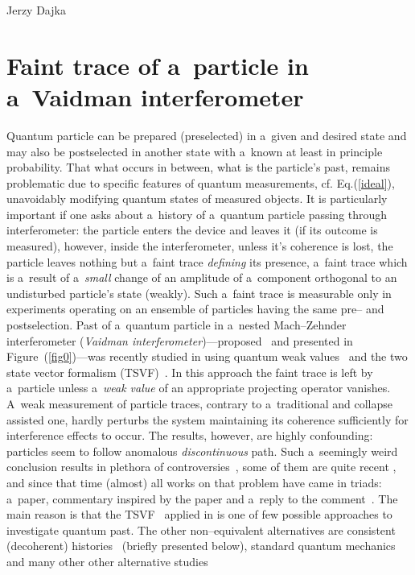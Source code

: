 \begin{artengenv}{Jerzy Dajka}
\section{Faint trace of a~particle in a~Vaidman interferometer}



Quantum particle can be prepared (preselected) in a~given and desired state and may also be postselected in another state with a~known at least in principle probability. That what occurs in between, what is the particle's past, remains problematic due to specific features of quantum measurements, cf. Eq.(\ref{ideal}), unavoidably modifying quantum states of measured objects. It is particularly important if one asks about a~history of a~quantum particle passing through interferometer: the particle enters the device and leaves it (if its outcome is measured), however, inside the interferometer, unless it's coherence is lost, the particle leaves nothing but a~faint trace {\it defining} its presence, a~faint trace which
is a~result of a~{\it small} change of an amplitude of a~component orthogonal to an undisturbed particle's state (weakly). Such a~faint trace is measurable  only in experiments operating on an
ensemble of particles having the same pre-- and postselection.
%
%
Past of a~quantum particle in a~nested Mach--Zehnder interferometer ({\it Vaidman interferometer})---proposed~\parencite{PhysRevA.87.052104} and presented in Figure~(\ref{fig0})---was recently studied in \parencite{PhysRevA.87.052104} using 
quantum weak values~\parencite{primus,weak,Aharonov2008} and the two state vector formalism (TSVF)~\parencite{Aharonov2008}. In this approach the faint trace is left by a~particle unless a~{\it weak value} of an appropriate projecting operator vanishes. A~weak measurement of particle traces, contrary to a~traditional and collapse assisted one, hardly perturbs the system maintaining its coherence sufficiently for interference effects to occur. The results, however, are highly confounding:  particles seem to follow anomalous {\it discontinuous} path. Such a~seemingly weird conclusion results in plethora of controversies~\parencite{PhysRevA.88.046102,PhysRevA.88.046103}, some of them are quite recent \parencite[cf.][]{lady}, and since that time  (almost) all  works  on that problem  have came in triads: a~paper, commentary inspired by the paper and a~reply to the comment~\parencite{PhysRevA.88.046102,PhysRevA.88.046103}.  
The main reason is that the TSVF~\parencite{Aharonov2008} applied in \parencite{PhysRevA.87.052104} is one of few possible approaches to investigate quantum past. The other non--equivalent alternatives are consistent (decoherent) histories~\parencite{PhysRevA.94.032115,PhysRevA.95.066101} (briefly presented below), standard quantum mechanics~\parencite{PhysRevA.96.022126,PhysRevA.99.026103,PhysRevA.99.026104} and many other other alternative studies

\end{artengenv}
